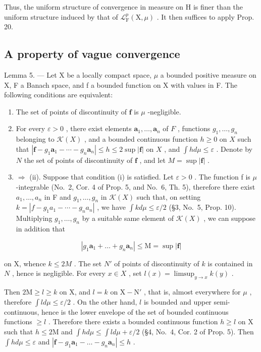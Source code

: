 Thus, the uniform structure of convergence in measure on H is finer than the uniform structure induced by that of \(\mathcal{L}_{\mathrm{F}}^{p}(\mathrm{X},\mu)\) . It then suffices to apply Prop. 20.

\subsection{A property of vague convergence}

Lemma 5. --- Let X be a locally compact space, \(\mu\) a bounded positive measure on X, F a Banach space, and f a bounded function on X with values in F. The following conditions are equivalent:

\begin{enumerate}
\def\labelenumi{(\roman{enumi})}
\item
  The set of points of discontinuity of \(\mathbf{f}\) is \(\mu\) -negligible.
\item
  For every \(\varepsilon > 0\) , there exist elements \(\mathbf{a}_1, \ldots, \mathbf{a}_n\) of \(F\) , functions \(g_1, \ldots, g_n\) belonging to \(\mathcal{K}(X)\) , and a bounded continuous function \(h \geqslant 0\) on \(X\) such that \(|\mathbf{f} - g_1 \mathbf{a}_1 - \cdots - g_n \mathbf{a}_n| \leqslant h \leqslant 2 \sup |\mathbf{f}|\) on \(X\) , and \(\int h d\mu \leqslant \varepsilon\) . Denote by \(N\) the set of points of discontinuity of \(\mathbf{f}\) , and let \(M = \sup |\mathbf{f}|\) .
\setcounter{enumi}{0}
\item
  \(\Rightarrow\) (ii). Suppose that condition (i) is satisfied. Let \(\varepsilon > 0\) . The function f is \(\mu\) -integrable (No.~2, Cor. 4 of Prop. 5, and No.~6, Th. 5), therefore there exist \(a_{1}, \ldots, a_{n}\) in F and \(g_{1}, \ldots, g_{n}\) in \(\mathcal{K}(X)\) such that, on setting \(k = |f - g_{1}a_{1} - \cdots - g_{n}a_{n}|\) , we have \(\int k d\mu \leqslant \varepsilon/2\) (§3, No.~5,
Prop. 10). Multiplying \(g_1, \ldots, g_n\) by a suitable same element of \(\mathcal{K}(X)\) , we can suppose in addition that
\end{enumerate}

\[
\left| g _ {1} \mathbf {a} _ {1} + \dots + g _ {n} \mathbf {a} _ {n} \right| \leqslant \mathrm{M} = \sup | \mathbf {f} |
\]

on X, whence \(k \leqslant 2M\) . The set \(N'\) of points of discontinuity of \(k\) is contained in \(N\) , hence is negligible. For every \(x \in X\) , set \(l(x) = \limsup_{y \to x} k(y)\) .

Then \(2\mathrm{M} \geqslant l \geqslant k\) on X, and \(l = k\) on \(\mathrm{X} - \mathrm{N}'\) , that is, almost everywhere for \(\mu\) , therefore \(\int l d\mu \leqslant \varepsilon / 2\) . On the other hand, \(l\) is bounded and upper semi-continuous, hence is the lower envelope of the set of bounded continuous functions \(\geqslant l\) . Therefore there exists a bounded continuous function \(h \geqslant l\) on X such that \(h \leqslant 2\mathrm{M}\) and \(\int h d\mu \leqslant \int l d\mu + \varepsilon / 2\) (§4, No.~4, Cor. 2 of Prop. 5). Then \(\int h d\mu \leqslant \varepsilon\) and \(|\mathbf{f} - g_1\mathbf{a}_1 - \dots - g_n\mathbf{a}_n| \leqslant h\) .

